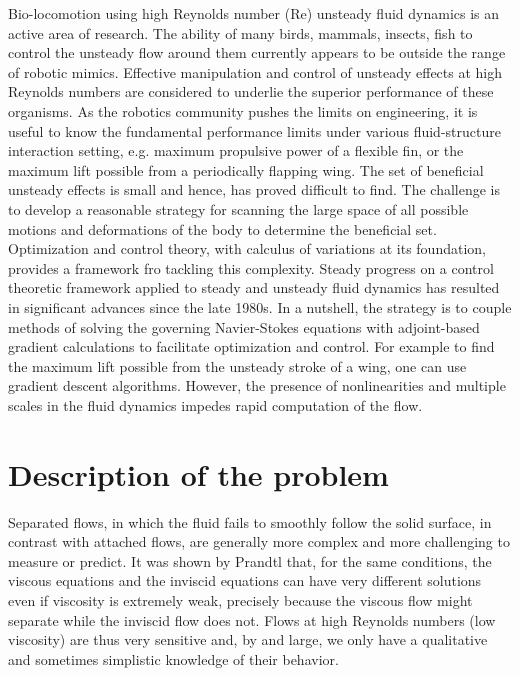 




Bio-locomotion using high Reynolds number (Re) unsteady fluid dynamics is an active area of research.
The ability of many birds, mammals, insects, fish to control the unsteady flow around them currently appears to be outside the range of robotic mimics.
Effective manipulation and control of unsteady effects at high Reynolds numbers are considered to underlie the superior performance of these organisms.
As the robotics community pushes the limits on engineering, it is useful to know the fundamental performance limits under various fluid-structure interaction setting, e.g. maximum propulsive power of a flexible fin, or the maximum lift possible from a periodically flapping wing.
The set of beneficial unsteady effects is small and hence, has proved difficult to find.
The challenge is to develop a reasonable strategy for scanning the large space of all possible motions and deformations of the body to determine the beneficial set.
Optimization and control theory, with calculus of variations at its foundation, provides a framework fro tackling this complexity.
Steady progress on a control theoretic framework applied to steady and unsteady fluid dynamics has resulted in significant advances since the late 1980s.
In a nutshell, the strategy is to couple methods of solving the governing Navier-Stokes equations with adjoint-based gradient calculations to facilitate optimization and control.
For example to find the maximum lift possible from the unsteady stroke of a wing, one can use gradient descent algorithms.
However, the presence of nonlinearities and multiple scales in the fluid dynamics impedes rapid computation of the flow.

\section{Description of the problem}

Separated flows, in which the fluid fails to smoothly follow the solid surface, in contrast with attached flows, are generally more complex and more challenging to measure or predict.
It was shown by Prandtl that, for the same conditions, the viscous equations and the inviscid equations can have very different solutions even if viscosity is extremely weak, precisely because the viscous flow might separate while the inviscid flow does not.
Flows at high Reynolds numbers (low viscosity) are thus very sensitive and, by and large, we only have a qualitative and sometimes simplistic knowledge of their behavior.


